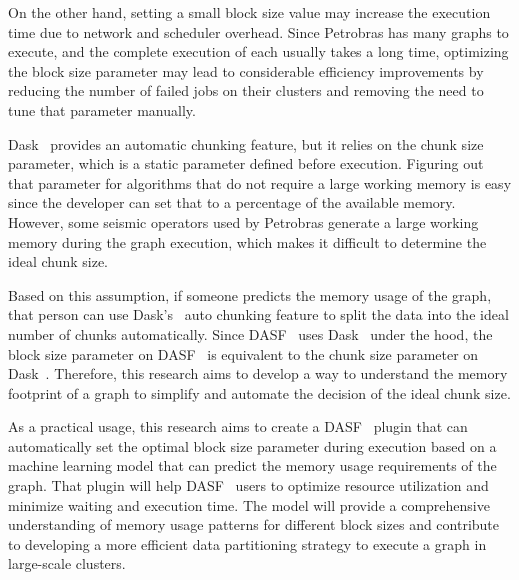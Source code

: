 On the other hand, setting a small block size value may increase the execution time due to network and scheduler overhead.
Since Petrobras has many graphs to execute, and the complete execution of each usually takes a long time, optimizing the block size parameter may lead to considerable efficiency improvements by reducing the number of failed jobs on their clusters and removing the need to tune that parameter manually.

Dask~\cite{dask} provides an automatic chunking feature, but it relies on the chunk size parameter, which is a static parameter defined before execution.
Figuring out that parameter for algorithms that do not require a large working memory is easy since the developer can set that to a percentage of the available memory.
However, some seismic operators used by Petrobras generate a large working memory during the graph execution, which makes it difficult to determine the ideal chunk size.

Based on this assumption, if someone predicts the memory usage of the graph, that person can use Dask's~\cite{dask} auto chunking feature to split the data into the ideal number of chunks automatically.
Since \ac{DASF}~\cite{dasf} uses Dask~\cite{dask} under the hood, the block size parameter on \ac{DASF}~\cite{dasf} is equivalent to the chunk size parameter on Dask~\cite{dask}.
Therefore, this research aims to develop a way to understand the memory footprint of a graph to simplify and automate the decision of the ideal chunk size.

As a practical usage, this research aims to create a \ac{DASF}~\cite{dasf} plugin that can automatically set the optimal block size parameter during execution based on a machine learning model that can predict the memory usage requirements of the graph.
That plugin will help \ac{DASF}~\cite{dasf} users to optimize resource utilization and minimize waiting and execution time.
The model will provide a comprehensive understanding of memory usage patterns for different block sizes and contribute to developing a more efficient data partitioning strategy to execute a graph in large-scale clusters.
